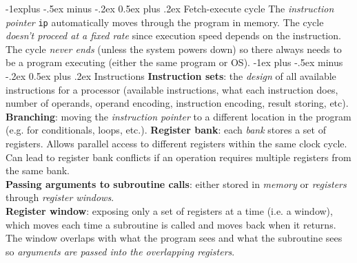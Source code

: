 \documentclass[10pt,landscape]{article}
\makeatletter
\renewcommand{\section}{\@startsection{section}{1}{0mm}%
                                {-1ex plus -.5ex minus -.2ex}%
                                {0.5ex plus .2ex}%
                                {\normalfont\scriptsize\bfseries}}
\renewcommand{\subsection}{\@startsection{subsection}{2}{0mm}%
                                {-1explus -.5ex minus -.2ex}%
                                {0.5ex plus .2ex}%
                                {\normalfont\scriptsize\bfseries}}
\makeatother
\begin{document}
\begin{multicols}{3}
\subsection{Fetch-execute cycle}
The \textit{instruction pointer} \texttt{ip} automatically moves through the program in memory. The cycle \textit{doesn't proceed at a fixed rate} since execution speed depends on the instruction. The cycle \textit{never ends} (unless the system powers down) so there always needs to be a program executing (either the same program or OS).
\section{Instructions}
\textbf{Instruction sets}: the \textit{design} of all available instructions for a processor (available instructions, what each instruction does, number of operands, operand encoding, instruction encoding, result storing, etc).\\
\textbf{Branching}: moving the \textit{instruction pointer} to a different location in the program (e.g. for conditionals, loops, etc.).
\textbf{Register bank}: each \textit{bank} stores a set of registers. Allows parallel access to different registers within the same clock cycle. Can lead to register bank conflicts if an operation requires multiple registers from the same bank. \\
\textbf{Passing arguments to subroutine calls}: either stored in \textit{memory} or \textit{registers} through \textit{register windows}.\\
\textbf{Register window}: exposing only a set of registers at a time (i.e. a window), which moves each time a subroutine is called and moves back when it returns. The window overlaps with what the program sees and what the subroutine sees so \textit{arguments are passed into the overlapping registers}.\\

\end{multicols}
\end{document}
